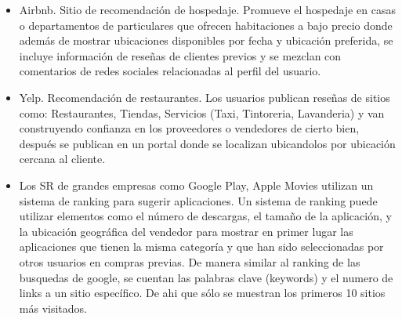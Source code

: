 \begin{itemize}

\item Airbnb. Sitio de recomendación de hospedaje. 
Promueve el hospedaje en casas o departamentos de particulares que ofrecen habitaciones a bajo precio donde además de mostrar ubicaciones disponibles por fecha y ubicación preferida, se incluye información de reseñas de clientes previos y se mezclan con comentarios de redes sociales relacionadas al perfil del usuario.

\item Yelp. Recomendación de restaurantes. 
Los usuarios publican reseñas de sitios como: Restaurantes, Tiendas, Servicios (Taxi, Tintoreria, Lavanderia) y van construyendo confianza en los proveedores o vendedores de cierto bien, después se publican en un portal donde se localizan ubicandolos por ubicación cercana al cliente.

\item Los SR de grandes empresas como
Google Play, Apple Movies  utilizan un sistema de ranking para sugerir aplicaciones. Un sistema de ranking puede utilizar elementos como el número de descargas, el tamaño de la aplicación, y la ubicación geográfica del vendedor para mostrar en primer lugar las aplicaciones que tienen la misma categoría y que han sido seleccionadas por otros usuarios en compras previas. De manera similar al ranking de las busquedas de google, se cuentan las palabras clave (keywords) y el numero de links a un sitio específico. De ahi que sólo se muestran los primeros 10 sitios más visitados. 
\end{itemize}
